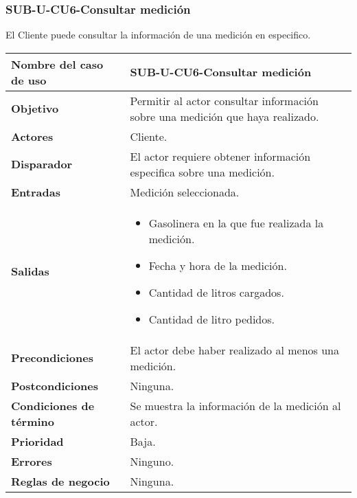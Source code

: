 %
%
%
%

\subsubsection{SUB-U-CU6-Consultar medición}\label{SUB-U-CU6}
El Cliente puede consultar la información de una medición en especifico.

\begin{longtable}{|J{5cm}|J{10.3cm}|}
	\hline
	\textbf{Nombre del caso de uso} &
		SUB-U-CU6-Consultar medición \\ \hline
	\textbf{Objetivo} &
		Permitir al actor consultar información sobre una medición que haya realizado. \\ \hline
	\textbf{Actores} &
		Cliente. \\ \hline 
	\textbf{Disparador} & 
		El actor requiere obtener información especifica sobre una medición.\\ \hline 
	\textbf{Entradas} & Medición seleccionada.
		\\ \hline 
	\textbf{Salidas} & 
		\begin{itemize}
			\item Gasolinera en la que fue realizada la medición.
			\item Fecha y hora de la medición.
			\item Cantidad de litros cargados.
			\item Cantidad de litro pedidos.
		\end{itemize} 
		\\ \hline
	\textbf{Precondiciones} &
		El actor debe haber realizado al menos una medición.\\ \hline
	\textbf{Postcondiciones} & Ninguna.
		\\ \hline
	\textbf{Condiciones de término} & Se muestra la información de la medición al actor.
		\\ \hline 
	\textbf{Prioridad} & 
		Baja. \\ \hline
	\textbf{Errores} & Ninguno.
		\\ \hline
	\textbf{Reglas de negocio} & Ninguna.
		 \\ \hline
\end{longtable}

